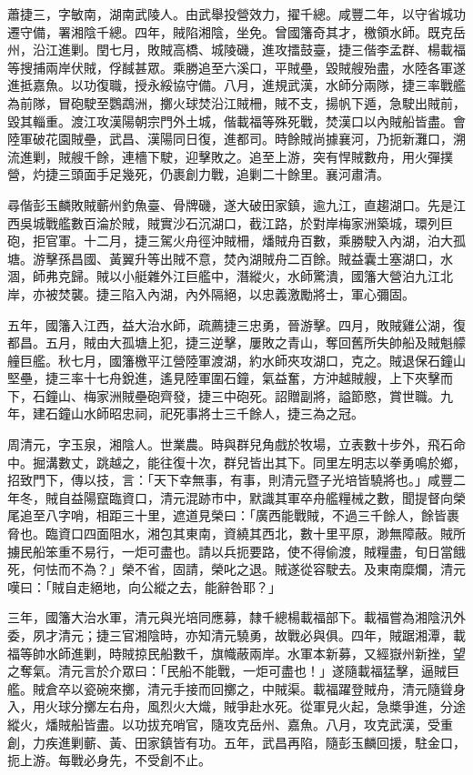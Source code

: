 \begin{pinyinscope}
蕭捷三，字敏南，湖南武陵人。由武舉投營效力，擢千總。咸豐二年，以守省城功遷守備，署湘陰千總。四年，賊陷湘陰，坐免。曾國籓奇其才，檄領水師。既克岳州，沿江進剿。閏七月，敗賊高橋、城陵磯，進攻擂鼓臺，捷三偕李孟群、楊載福等搜捕兩岸伏賊，俘馘甚眾。乘勝追至六溪口，平賊壘，毀賊艘殆盡，水陸各軍遂進抵嘉魚。以功復職，授永綏協守備。八月，進規武漢，水師分兩隊，捷三率戰艦為前隊，冒砲駛至鸚鵡洲，擲火球焚沿江賊柵，賊不支，揚帆下遁，急駛出賊前，毀其輜重。渡江攻漢陽朝宗門外土城，偕載福等殊死戰，焚漢口以內賊船皆盡。會陸軍破花園賊壘，武昌、漢陽同日復，進都司。時餘賊尚據襄河，乃扼新灘口，溯流進剿，賊艘千餘，連檣下駛，迎擊敗之。追至上游，突有悍賊數舟，用火彈撲營，灼捷三頭面手足幾死，仍裹創力戰，追剿二十餘里。襄河肅清。

尋偕彭玉麟敗賊蘄州釣魚臺、骨牌磯，遂大破田家鎮，逾九江，直趨湖口。先是江西吳城戰艦數百淪於賊，賊實沙石沉湖口，截江路，於對岸梅家洲築城，環列巨砲，拒官軍。十二月，捷三駕火舟徑沖賊柵，燔賊舟百數，乘勝駛入內湖，泊大孤塘。游擊孫昌國、黃翼升等出賊不意，焚內湖賊舟二百餘。賊益囊土塞湖口，水涸，師弗克歸。賊以小艇雜外江巨艦中，潛縱火，水師驚潰，國籓大營泊九江北岸，亦被焚襲。捷三陷入內湖，內外隔絕，以忠義激勵將士，軍心彌固。

五年，國籓入江西，益大治水師，疏薦捷三忠勇，晉游擊。四月，敗賊雞公湖，復都昌。五月，賊由大孤塘上犯，捷三逆擊，屢敗之青山，奪回舊所失帥船及賊魁艨艟巨艦。秋七月，國籓檄平江營陸軍渡湖，約水師夾攻湖口，克之。賊退保石鐘山堅壘，捷三率十七舟銳進，遙見陸軍圍石鐘，氣益奮，方沖越賊艘，上下夾擊而下，石鐘山、梅家洲賊壘砲齊發，捷三中砲死。詔贈副將，謚節愍，賞世職。九年，建石鐘山水師昭忠祠，祀死事將士三千餘人，捷三為之冠。

周清元，字玉泉，湘陰人。世業農。時與群兒角戲於牧場，立表數十步外，飛石命中。掘溝數丈，跳越之，能往復十次，群兒皆出其下。同里左明志以拳勇鳴於鄉，招致門下，傳以技，言：「天下幸無事，有事，則清元暨子光培皆驍將也。」咸豐二年冬，賊自益陽竄臨資口，清元混跡市中，默識其軍卒舟艦糧械之數，聞提督向榮尾追至八字哨，相距三十里，遮道見榮曰：「廣西能戰賊，不過三千餘人，餘皆裹脅也。臨資口四面阻水，湘包其東南，資繞其西北，數十里平原，渺無障蔽。賊所擄民船笨重不易行，一炬可盡也。請以兵扼要路，使不得偷渡，賊糧盡，旬日當餓死，何怯而不為？」榮不省，固請，榮叱之退。賊遂從容駛去。及東南糜爛，清元嘆曰：「賊自走絕地，向公縱之去，能辭咎耶？」

三年，國籓大治水軍，清元與光培同應募，隸千總楊載福部下。載福嘗為湘陰汛外委，夙才清元；捷三官湘陰時，亦知清元驍勇，故戰必與俱。四年，賊踞湘潭，載福等帥水師進剿，時賊掠民船數千，旗幟蔽兩岸。水軍本新募，又經嶽州新挫，望之奪氣。清元言於介眾曰：「民船不能戰，一炬可盡也！」遂隨載福猛擊，逼賊巨艦。賊倉卒以瓷碗來擲，清元手接而回擲之，中賊渠。載福躍登賊舟，清元隨聳身入，用火球分擲左右舟，風烈火大熾，賊爭赴水死。從軍見火起，急槳爭進，分途縱火，燔賊船皆盡。以功拔充哨官，隨攻克岳州、嘉魚。八月，攻克武漢，受重創，力疾進剿蘄、黃、田家鎮皆有功。五年，武昌再陷，隨彭玉麟回援，駐金口，扼上游。每戰必身先，不受創不止。


\end{pinyinscope}
